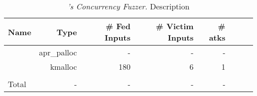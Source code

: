 \begin{table}[ht!]
	\footnotesize
	\centering
	\begin{tabular}{l|r|r|r|r|r|r|r}
		{\bf Name} & {\bf Type} & {\bf \# Fed Inputs}& {\bf \# Victim Inputs} & {\bf \# atks}  \\
		\hline
		\apache    &   apr\_palloc   &  -   &  -  & -  \\
		\linux     &  kmalloc  & 180   &  6  &  1   \\
		\hline\\[-2.3ex]
		Total      &    -     &  -  & -  & -\\
	\end{tabular}
	\vspace{-.1in}
	\caption{{\em \xxx's Concurrency Fuzzer.} \rm {Description}} 
	\label{tab:eval}
	\vspace{-.2in}
\end{table}


